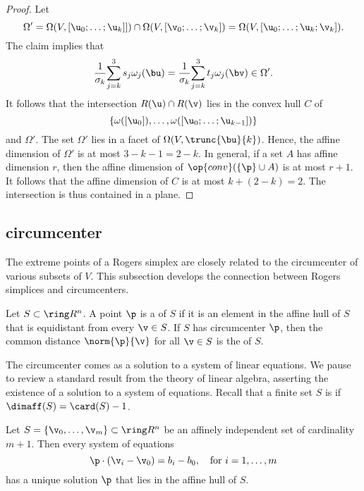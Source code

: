 \begin{cnl}
\begin{proof}
Let
\[
\Omega'=\Omega(V,\listdots{\u}{0}{k}]) 
\cap \Omega(V,\listdots{\v}{0}{k})=
\Omega(V,[\u_0;\ldots;\u_{k};\v_{k}]).
\]
The claim implies that 
\[
\frac{1}{\sigma_k}\sumupto{j}{k}{3}{s_j \omega_j(\bu)} = 
\frac{1}{\sigma_k}\sumupto{j}{k}{3}{t_j \omega_j(\bv) \in\Omega'}.
\]
It follows that the intersection $R(\u)\cap R(\v)$ lies in the convex
hull $C$ of
\[
\{\omega([\u_0]),\ldots,\omega( [\u_0;\ldots; \u_{k-1}])\}
\]
and $\Omega'$.  The set $\Omega'$ lies in a facet of
$\Omega(V,\trunc{\bu}{k})$.  Hence, the affine dimension of $\Omega'$
is at most $3-k-1=2-k$.  In general, if a set $A$ has affine dimension
$r$, then the affine dimension of $\op{conv}(\braced{\p}\cup A)$ is at most
$r+1$.  It follows that the affine dimension of $C$ is at most 
$k + (2-k) = 2$.  The intersection is thus contained in a plane.
\end{proof}


\subsection{circumcenter}\label{circumcenter}

The extreme points of a Rogers simplex are closely related to the
circumcenter of various subsets of $V$.  This subsection develops the
connection between Rogers simplices and circumcenters.


\begin{definition}
\label{def:circumcenter}
%
Let $S\subset\vecR{n}$.  A point $\p$ is a  of
$S$ if it is an element in the affine hull of $S$ that is equidistant
from every $\v\in S$.  If $S$ has circumcenter $\p$, then the common
distance $\norm{\p}{\v}$ for all $\v\in S$ is the
 of $S$.
\end{definition}


The circumcenter comes as a solution to a system of linear equations.
We pause to review a standard result from the theory of linear
algebra, asserting the existence of a solution to a system of
equations.  Recall that a finite set $S$ is 
if $\dimaff(S) = \card(S) -1$.  
%
%


\begin{lemma}
\label{lemma:affine-system} 
%
Let $S=\setenumdots{\v}{0}{m}\subset \vecR{n}$ be an affinely
independent set of cardinality $m+1$.  Then every system of equations
\[  
\p \cdot (\v_i - \v_0) = b_i-b_0,\quad \text{for } \fordots{i}{1}{m}
\] 
has a unique solution  $\p$ that lies in the affine hull of $S$.
\end{lemma}



\end{cnl}
